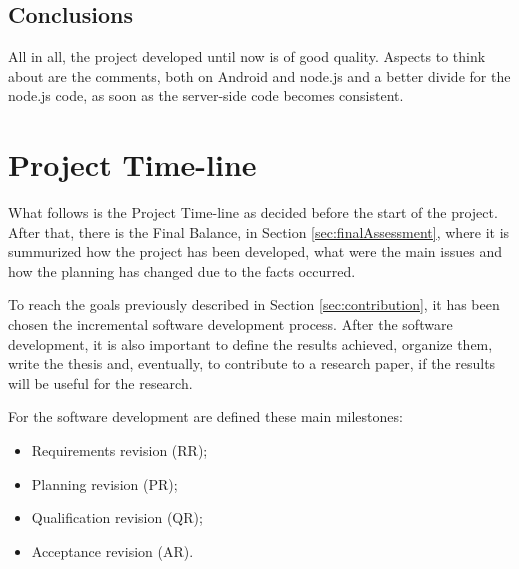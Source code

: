 \subsection{Conclusions}

All in all, the project developed until now is of good quality. Aspects to think about are the comments, both on Android and node.js and a better divide for the node.js code, as soon as the server-side code becomes consistent.

\newpage

\section{Project Time-line}
\label{sec:timeline}
What follows is the Project Time-line as decided before the start of the project. After that, there is the Final Balance, in Section \ref{sec:finalAssessment}, where it is summurized how the project has been developed, what were the main issues and how the planning has changed due to the facts occurred.

To reach the goals previously described in Section \ref{sec:contribution}, it has been chosen the incremental software development process. After the software development, it is also important to define the results achieved, organize them, write the thesis and, eventually, to contribute to a research paper, if the results will be useful for the research.

For the software development are defined these main milestones:
\begin{itemize}
\item Requirements revision (RR);
\item Planning revision (PR);
\item Qualification revision (QR);
\item Acceptance revision (AR).
\end{itemize}

